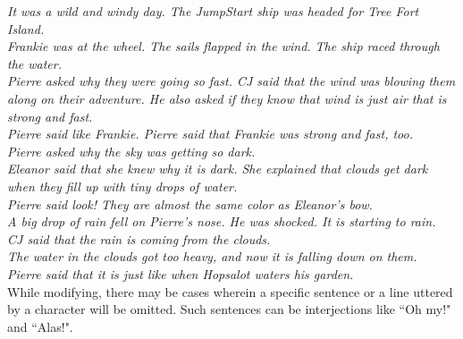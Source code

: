 	\noindent
	\hspace{1 in}\emph{It was a wild and windy day. The JumpStart ship was headed for Tree Fort Island.} \\
	\hspace*{1 in}\emph{Frankie was at the wheel. The sails flapped in the wind. The ship raced through the water.} \\
	\hspace*{1 in}\emph{Pierre asked why they were going so fast. CJ said that the wind was blowing them along on their adventure. He also asked if they know that wind is just air that is strong and fast.} \\
	\hspace*{1 in}\emph{Pierre said like Frankie. Pierre said that Frankie was strong and fast, too.} \\
	\hspace*{1 in}\emph{Pierre asked why the sky was getting so dark.}\\
	\hspace*{1 in}\emph{Eleanor said that she knew why it is dark. She explained that clouds get dark when they fill up with tiny drops of water.} \\
	\hspace*{1 in}\emph{Pierre said look! They are almost the same color as Eleanor's bow.} \\
	\hspace*{1 in}\emph{A big drop of rain fell on Pierre's nose. He was shocked. It is starting to rain.} \\
	\hspace*{1 in}\emph{CJ said that the rain is coming from the clouds.} \\
	\hspace*{1 in}\emph{The water in the clouds got too heavy, and now it is falling down on them.} \\
	\hspace*{1 in}\emph{Pierre said that it is just like when Hopsalot waters his garden.} \\
	
While modifying, there may be cases wherein a specific sentence or a line uttered by a character will be omitted. Such sentences can be interjections like ``Oh my!" and ``Alas!".